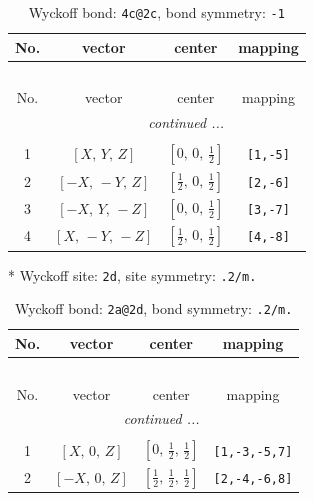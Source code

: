 \documentclass[fleqn,8pt]{jsarticle}
\begin{document}
\begin{longtable}{cccc}
\caption{Wyckoff bond: {\tt 4c@2c}, bond symmetry: {\tt -1}}
 \\
 \hline \hline
No. & vector & center & mapping \\ \hline \endfirsthead

\multicolumn{3}{l}{\tablename\ \thetable{}} \\
 \hline \hline
No. & vector & center & mapping \\ \hline \endhead

 \hline \hline
\multicolumn{3}{r}{\footnotesize\it continued ...} \\ \endfoot

 \hline \hline
\multicolumn{3}{r}{} \\ \endlastfoot

1 & $\left[ X,\, Y,\, Z \right]$ & $\left[ 0,\, 0,\, \frac{1}{2} \right]$ & {\tt [1,-5]} \\ \hline
2 & $\left[ - X,\, - Y,\, Z \right]$ & $\left[ \frac{1}{2},\, 0,\, \frac{1}{2} \right]$ & {\tt [2,-6]} \\ \hline
3 & $\left[ - X,\, Y,\, - Z \right]$ & $\left[ 0,\, 0,\, \frac{1}{2} \right]$ & {\tt [3,-7]} \\ \hline
4 & $\left[ X,\, - Y,\, - Z \right]$ & $\left[ \frac{1}{2},\, 0,\, \frac{1}{2} \right]$ & {\tt [4,-8]} \\
\end{longtable}
* Wyckoff site: {\tt 2d}, site symmetry: {\tt .2/m.}
\renewcommand{\arraystretch}{1.2}
\begin{longtable}{cccc}
\caption{Wyckoff bond: {\tt 2a@2d}, bond symmetry: {\tt .2/m.}}
 \\
 \hline \hline
No. & vector & center & mapping \\ \hline \endfirsthead

\multicolumn{3}{l}{\tablename\ \thetable{}} \\
 \hline \hline
No. & vector & center & mapping \\ \hline \endhead

 \hline \hline
\multicolumn{3}{r}{\footnotesize\it continued ...} \\ \endfoot

 \hline \hline
\multicolumn{3}{r}{} \\ \endlastfoot

1 & $\left[ X,\, 0,\, Z \right]$ & $\left[ 0,\, \frac{1}{2},\, \frac{1}{2} \right]$ & {\tt [1,-3,-5,7]} \\ \hline
2 & $\left[ - X,\, 0,\, Z \right]$ & $\left[ \frac{1}{2},\, \frac{1}{2},\, \frac{1}{2} \right]$ & {\tt [2,-4,-6,8]} \\
\end{longtable}
\end{document}

